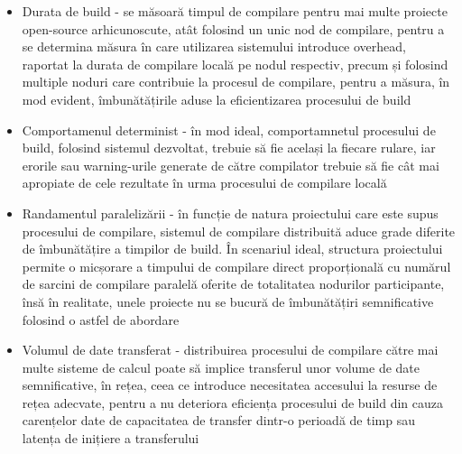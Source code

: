 \begin{itemize}
    \item Durata de build - se măsoară timpul de compilare pentru mai multe proiecte open-source arhicunoscute,
    atât folosind un unic nod de compilare, pentru a se determina măsura în care utilizarea sistemului
    introduce overhead, raportat la durata de compilare locală pe nodul respectiv, precum și folosind
    multiple noduri care contribuie la procesul de compilare, pentru a măsura, în mod evident, îmbunătățirile
    aduse la eficientizarea procesului de build
    \item Comportamenul determinist - în mod ideal, comportamnetul procesului de build, folosind sistemul
    dezvoltat, trebuie să fie același la fiecare rulare, iar erorile sau warning-urile generate de către
    compilator trebuie să fie cât mai apropiate de cele rezultate în urma procesului de compilare locală
    \item Randamentul paralelizării - în funcție de natura proiectului care este supus procesului de compilare,
    sistemul de compilare distribuită aduce grade diferite de îmbunătățire a timpilor de build. În scenariul ideal,
    structura proiectului permite o micșorare a timpului de compilare direct proporțională cu numărul de sarcini de
    compilare paralelă oferite de totalitatea nodurilor participante, însă în realitate, unele proiecte nu se bucură
    de îmbunătățiri semnificative folosind o astfel de abordare
    \item Volumul de date transferat - distribuirea procesului de compilare către mai multe sisteme de calcul poate
    să implice transferul unor volume de date semnificative, în rețea, ceea ce introduce necesitatea accesului la 
    resurse de rețea adecvate, pentru a nu deteriora eficiența procesului de build din cauza carențelor date de 
    capacitatea de transfer dintr-o perioadă de timp sau latența de inițiere a transferului
\end{itemize}